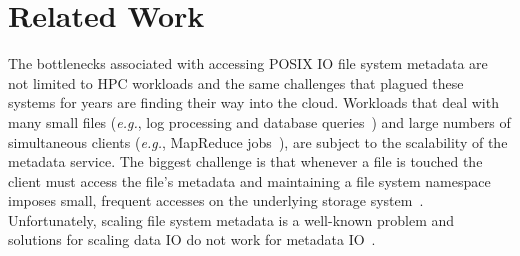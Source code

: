 \section{Related Work} 
\label{sec:related-work}

The bottlenecks associated with accessing POSIX IO file system metadata are not
limited to HPC workloads and the same challenges that plagued these systems for
years are finding their way into the cloud. Workloads that deal with many small
files ({\it e.g.}, log processing and database
queries~\cite{thusoo:sigmod2010-facebook-infrastructure}) and large numbers of
simultaneous clients ({\it e.g.}, MapReduce
jobs~\cite{mckusick:acm2010-gfs-evolution}), are subject to the scalability of
the metadata service. The biggest challenge is that whenever a file is touched
the client must access the file's metadata and maintaining a file system
namespace imposes small, frequent accesses on the underlying storage
system~\cite{roselli:atec2000-FS-workloads}.  Unfortunately, scaling file
system metadata is a well-known problem and solutions for scaling data IO do
not work for metadata IO~\cite{roselli:atec2000-FS-workloads,
abad:ucc2012-mimesis, alam:pdsw2011-metadata-scaling, weil:osdi2006-ceph}. 
%
%
